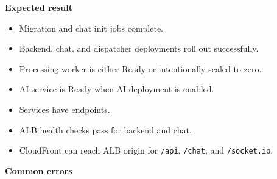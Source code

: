 \begin{Shaded}
\begin{Highlighting}[]
 
\end{Highlighting}
\end{Shaded}

\begin{Shaded}
\begin{Highlighting}[]
 
\end{Highlighting}
\end{Shaded}

\vspace{0.5em}\noindent\textbf{Expected result}\par

\begin{itemize}
\tightlist
\item
  Migration and chat init jobs complete.
\item
  Backend, chat, and dispatcher deployments roll out successfully.
\item
  Processing worker is either Ready or intentionally scaled to zero.
\item
  AI service is Ready when AI deployment is enabled.
\item
  Services have endpoints.
\item
  ALB health checks pass for backend and chat.
\item
  CloudFront can reach ALB origin for \texttt{/\allowbreak{}api}, \texttt{/\allowbreak{}chat}, and
  \texttt{/\allowbreak{}socket.\allowbreak{}io}.
\end{itemize}

\vspace{0.5em}\noindent\textbf{Common errors}\par

